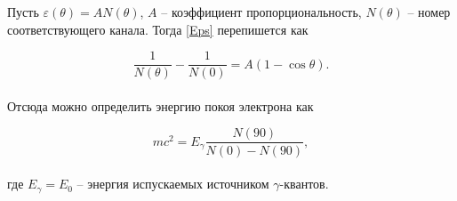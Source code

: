 Пусть $\varepsilon(\theta) = AN(\theta)$, $A$ -- коэффициент пропорциональность,
$N(\theta)$ -- номер соответствующего канала. Тогда \eqref{Eps} перепишется как

\begin{equation}
  \label{1b} \dfrac{1}{N(\theta)} - \dfrac{1}{N(0)} = A(1-\cos \theta).
\end{equation}
\\
Отсюда можно определить энергию покоя электрона как

\begin{equation}\label{2}
  mc^2 = E_\gamma \dfrac{N(90)}{N(0) - N(90)},
\end{equation}
\\
где $E_\gamma = E_0$ -- энергия испускаемых источником $\gamma$-квантов.

